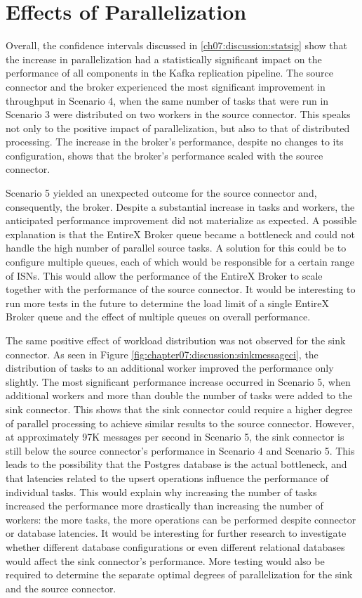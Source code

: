 \section{Effects of Parallelization}
Overall, the confidence intervals discussed in \ref{ch07:discussion:statsig} show that the increase in parallelization had a statistically significant impact on the performance of all components in the Kafka replication pipeline. The source connector and the broker experienced the most significant improvement in throughput in Scenario 4, when the same number of tasks that were run in Scenario 3 were distributed on two workers in the source connector. This speaks not only to the positive impact of parallelization, but also to that of distributed processing. The increase in the broker's performance, despite no changes to its configuration, shows that the broker's performance scaled with the source connector.

Scenario 5 yielded an unexpected outcome for the source connector and, consequently, the broker. Despite a substantial increase in tasks and workers, the anticipated performance improvement did not materialize as expected. A possible explanation is that the EntireX Broker queue became a bottleneck and could not handle the high number of parallel source tasks. A solution for this could be to configure multiple queues, each of which would be responsible for a certain range of \ac{ISN}s. This would allow the performance of the EntireX Broker to scale together with the performance of the source connector. It would be interesting to run more tests in the future to determine the load limit of a single EntireX Broker queue and the effect of multiple queues on overall performance.

The same positive effect of workload distribution was not observed for the sink connector. As seen in Figure \ref{fig:chapter07:discussion:sinkmessageci}, the distribution of tasks to an additional worker improved the performance only slightly. The most significant performance increase occurred in Scenario 5, when additional workers and more than double the number of tasks were added to the sink connector. This shows that the sink connector could require a higher degree of parallel processing to achieve similar results to the source connector. However, at approximately 97K messages per second in Scenario 5, the sink connector is still below the source connector's performance in Scenario 4 and Scenario 5. This leads to the possibility that the Postgres database is the actual bottleneck, and that latencies related to the upsert operations influence the performance of individual tasks. This would explain why increasing the number of tasks increased the performance more drastically than increasing the number of workers: the more tasks, the more operations can be performed despite connector or database latencies. It would be interesting for further research to investigate whether different database configurations or even different relational databases would affect the sink connector's performance. More testing would also be required to determine the separate optimal degrees of parallelization for the sink and the source connector.

